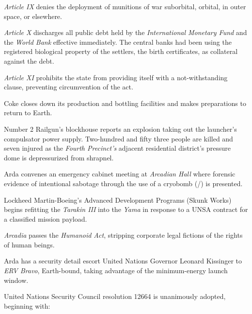 \item {\it Article IX} denies the deployment of munitions of war suborbital, orbital, in outer space, or elsewhere.

\item {\it Article X} discharges all public debt held by the {\it International Monetary Fund} and the {\it World Bank} effective immediately. The central banks had been using the registered biological property of the settlers, the birth certificates, as collateral against the debt.

\item {\it Article XI} prohibits the state from providing itself with a not-withstanding clause, preventing circumvention of the act.
\stopitemize
\StopTimelineDocument
\StopTimelineDate

Coke closes down its production and bottling facilities and makes preparations to return to Earth.
\StopTimelineDate

Number 2 Railgun's blockhouse reports an explosion taking out the launcher's compulsator power supply. Two-hundred and fifty three people are killed and seven injured as the {\it Fourth Precinct's} adjacent residential district's pressure dome is depressurized from shrapnel.

Arda convenes an emergency cabinet meeting at {\it Arcadian Hall} where forensic evidence of intentional sabotage through the use of a cryobomb (/) is presented.
\StopTimelineDate

Lockheed Martin-Boeing's Advanced Development Programs (Skunk Works) begins refitting the {\it Tarakin III} into the {\it Yama} in response to a UNSA contract for a classified mission payload.
\StopTimelineDate

{\it Arcadia} passes the {\it Humanoid Act}, stripping corporate legal fictions of the rights of human beings.
\StopTimelineDate

Arda has a security detail escort United Nations Governor Leonard Kissinger to {\it ERV Bravo}, Earth-bound, taking advantage of the minimum-energy launch window.
\StopTimelineDate

United Nations Security Council resolution 12664 is unanimously adopted, beginning with:

